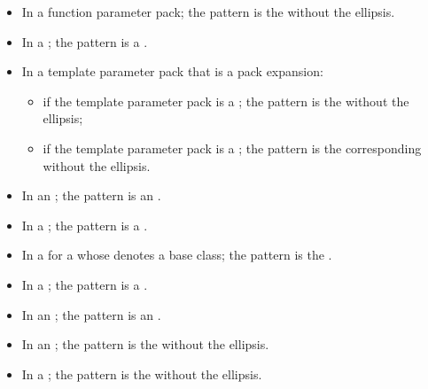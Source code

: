 \documentclass{wg21}
\begin{document}
\begin{itemize}
    \item In a function parameter pack; the pattern is the
     without the ellipsis.

    \item In a ;
    the pattern is a .

    \item In a template parameter pack that is a pack expansion:
    \begin{itemize}
        \item
        if the template parameter pack is a ;
        the pattern is the  without the ellipsis;

        \item
        if the template parameter pack is a ;
        the pattern is the corresponding 
        without the ellipsis.
    \end{itemize}

    \item In an ;
    the pattern is an .

    \item In a ;
    the pattern is a .

    \item In a  for a
     whose  denotes a
    base class; the pattern is the .

    \item In a ;
    the pattern is a .

    \item In an ; the pattern is
    an .

    \item In an ; the pattern is
    the  without the ellipsis.

    \item In a ; the pattern is
    the  without the ellipsis.


\end{itemize}
\end{document}
